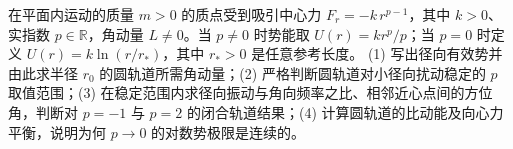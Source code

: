在平面内运动的质量 \(m>0\) 的质点受到吸引中心力 \(F_r=-k\,r^{p-1}\)，其中 \(k>0\)、实指数 \(p\in\mathbb R\)，角动量 \(L\ne0\)。当 \(p\ne0\) 时势能取 \(U(r)=kr^p/p\)；当 \(p=0\) 时定义 \(U(r)=k\ln(r/r_*)\)，其中 \(r_*>0\) 是任意参考长度。
(1) 写出径向有效势并由此求半径 \(r_0\) 的圆轨道所需角动量；(2) 严格判断圆轨道对小径向扰动稳定的 \(p\) 取值范围；(3) 在稳定范围内求径向振动与角向频率之比、相邻近心点间的方位角，判断对 \(p=-1\) 与 \(p=2\) 的闭合轨道结果；(4) 计算圆轨道的比动能及向心力平衡，说明为何 \(p\to0\) 的对数势极限是连续的。
